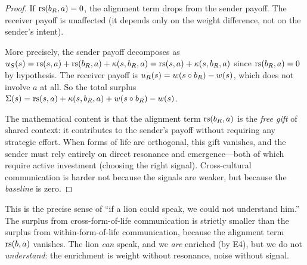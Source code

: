 \begin{proof}
If $\mathrm{rs}(b_R, a) = 0$, the alignment term drops from the sender payoff.
The receiver payoff is unaffected (it depends only on the weight
difference, not on the sender's intent).

More precisely, the sender payoff decomposes as
$u_S(s) = \mathrm{rs}(s, a) + \mathrm{rs}(b_R, a) + \kappa(s, b_R, a) = \mathrm{rs}(s, a) + \kappa(s, b_R, a)$
since $\mathrm{rs}(b_R, a) = 0$ by hypothesis. The receiver payoff is
$u_R(s) = w(s \circ b_R) - w(s)$, which does not involve $a$ at all.
So the total surplus $\Sigma(s) = \mathrm{rs}(s, a) + \kappa(s, b_R, a) + w(s \circ b_R) - w(s)$.

The mathematical content is that the alignment term $\mathrm{rs}(b_R, a)$ is the
\emph{free gift} of shared context: it contributes to the sender's payoff
without requiring any strategic effort. When forms of life are orthogonal,
this gift vanishes, and the sender must rely entirely on direct resonance
and emergence---both of which require active investment (choosing the right
signal). Cross-cultural communication is harder not because the signals are
weaker, but because the \emph{baseline} is zero.
\end{proof}

\begin{interpretation}
This is the precise sense of ``if a lion could speak, we could not understand
him.'' The surplus from cross-form-of-life communication is strictly smaller
than the surplus from within-form-of-life communication, because the
alignment term $\mathrm{rs}(b, a)$ vanishes. The lion \emph{can} speak, and we
\emph{are} enriched (by E4), but we do not \emph{understand}: the
enrichment is weight without resonance, noise without signal.
\end{interpretation}

